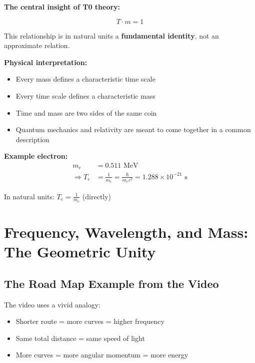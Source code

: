 	\begin{vorteil}
		\textbf{The central insight of T0 theory:}
		
		\begin{equation}
			\boxed{T \cdot m = 1}
		\end{equation}
		
		This relationship is in natural units a \textbf{fundamental identity}, not an approximate relation.
		
		\textbf{Physical interpretation:}
		\begin{itemize}
			\item Every mass defines a characteristic time scale
			\item Every time scale defines a characteristic mass
			\item Time and mass are two sides of the same coin
			\item Quantum mechanics and relativity are meant to come together in a common description
		\end{itemize}
		
		\textbf{Example electron:}
		\begin{align}
			m_e &= 0.511 \text{ MeV} \\
			\Rightarrow T_e &= \frac{1}{m_e} = \frac{\hbar}{m_e c^2} = 1.288 \times 10^{-21} \text{ s}
		\end{align}
		
		In natural units: $T_e = \frac{1}{m_e}$ (directly)
	\end{vorteil}
	
	\section{Frequency, Wavelength, and Mass: The Geometric Unity}
	
	\subsection{The Road Map Example from the Video}
	
	The video uses a vivid analogy:
	\begin{itemize}
		\item Shorter route = more curves = higher frequency
		\item Same total distance = same speed of light
		\item More curves = more angular momentum = more energy
	\end{itemize}
	
